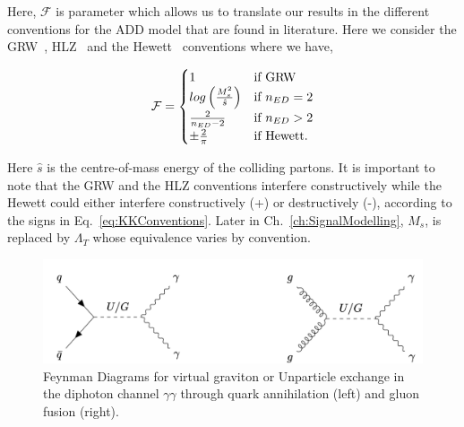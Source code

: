 Here, $\mathcal{F}$ is parameter which allows us to translate our results in the different conventions for the ADD model that are found in literature. Here we  consider the GRW~\cite{Giudice:1998ck}, HLZ~\cite{Han:1998sg} and the Hewett~\cite{Hewett:1998sn} conventions where we have, 

\begin{equation}
\mathcal{F}=
    \begin{cases}
        1 & \text{if } \textnormal{GRW} \\
        log\left(\frac{M^2_s}{\hat{s}}\right) & \text{if } n_{ED} = 2 \\
        \frac{2}{n_{ED} - 2} & \text{if } n_{ED} > 2 \\
        \pm \frac{2}{\pi} & \text{if } \textnormal{Hewett}.
    \end{cases}
    \label{eq:KKConventions}
\end{equation} 

Here $\hat{s}$ is the centre-of-mass energy of the colliding partons. It is important to note that the GRW and the HLZ conventions interfere constructively while the Hewett could either interfere constructively (+) or destructively (-), according to the signs in Eq.~\ref{eq:KKConventions}. Later in Ch.~\ref{ch:SignalModelling}, $M_s$, is replaced by $\Lambda_{T}$ whose equivalence varies by convention.




\begin{figure}[ht]
    \centering
    \includegraphics[scale=0.5]{fig/FeynmanDiagramUG.png}
    \caption{Feynman Diagrams for virtual graviton or Unparticle exchange in the diphoton channel $\gamma\gamma$ through quark annihilation (left) and gluon fusion (right).}
    \label{fig:FeynmanDiagramUG}
\end{figure}

